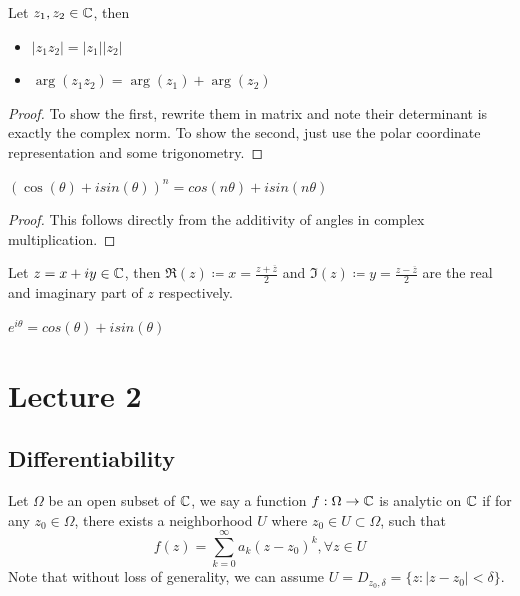 \documentclass{article}
\begin{document}
\begin{proposition}
    Let $z_1, z_2 \in \mathbb{C}$, then
    \begin{itemize}
        \item $|z_1 z_2| = |z_1| |z_2|$
        \item $\arg(z_1 z_2) = \arg(z_1) + \arg(z_2)$
    \end{itemize}
\end{proposition}

\begin{proof}
    To show the first, rewrite them in matrix and note their determinant is exactly the complex norm. To show the second, just use the polar coordinate representation and some trigonometry.
\end{proof}

\begin{corollary}
    $(\cos(\theta) + i sin(\theta))^n = cos(n \theta) + i sin(n \theta)$
\end{corollary}

\begin{proof}
    This follows directly from the additivity of angles in complex multiplication.
\end{proof}

\begin{definition}
    Let $z = x + iy \in \mathbb{C}$, then $\Re(z) \coloneqq x = \frac{z + \overline{z}}{2}$ and $\Im(z) \coloneqq y = \frac{z - \overline{z}}{2}$ are the real and imaginary part of $z$ respectively.
\end{definition}

\begin{theorem}
    $e^{i \theta} = cos(\theta) + i sin(\theta)$
\end{theorem}

\section{Lecture 2}

\subsection{Differentiability}

\begin{definition}
Let $\Omega$ be an open subset of $\mathbb{C}$, we say a function $f: \Omega \to \mathbb{C}$ is analytic on $\mathbb{C}$ if for any $z_0 \in \Omega$, there exists a neighborhood $U$ where $z_0 \in U \subset \Omega$, such that
\[f(z) = \sum_{k = 0}^\infty a_k (z - z_0)^k, \forall z \in U\]
Note that without loss of generality, we can assume $U = D_{z_0, \delta} = \{z: |z - z_0| < \delta\}$.
\end{definition}
\end{document}
